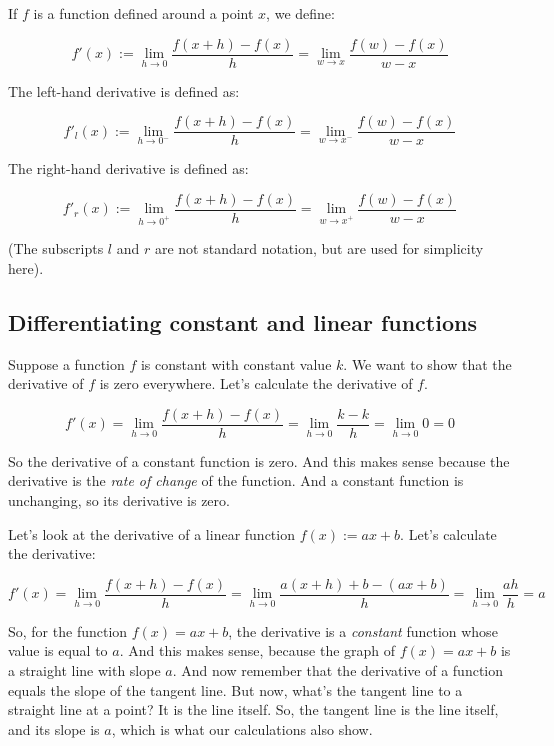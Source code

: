 \documentclass[10pt]{amsart}
\begin{document}
If $f$ is a function defined around a point $x$, we define:

\begin{equation*}
  f'(x) := \lim_{h \to 0} \frac{f(x + h) - f(x)}{h} = \lim_{w \to x} \frac{f(w) - f(x)}{w - x}
\end{equation*}

The left-hand derivative is defined as:

\begin{equation*}
  f'_l(x) := \lim_{h \to 0^-} \frac{f(x + h) - f(x)}{h} = \lim_{w \to x^-} \frac{f(w) - f(x)}{w - x}
\end{equation*}

The right-hand derivative is defined as:

\begin{equation*}
  f'_r(x) := \lim_{h \to 0^+} \frac{f(x + h) - f(x)}{h} = \lim_{w \to x^+} \frac{f(w) - f(x)}{w - x}
\end{equation*}

(The subscripts $l$ and $r$ are not standard notation, but are used
for simplicity here).

\subsection{Differentiating constant and linear functions}

Suppose a function $f$ is constant with constant value $k$. We want to
show that the derivative of $f$ is zero everywhere. Let's calculate
the derivative of $f$.

\begin{equation*}
  f'(x) = \lim_{h \to 0} \frac{f(x + h) - f(x)}{h} = \lim_{h \to 0} \frac{k - k}{h} = \lim_{h \to 0} 0 = 0
\end{equation*}

So the derivative of a constant function is zero. And this makes sense
because the derivative is the {\em rate of change} of the
function. And a constant function is unchanging, so its derivative is zero.

Let's look at the derivative of a linear function $f(x) := ax + b$. Let's calculate the derivative:

\begin{equation*}
  f'(x) = \lim_{h \to 0} \frac{f(x + h) - f(x)}{h} = \lim_{h \to 0} \frac{a(x + h) + b - (ax + b)}{h} = \lim_{h \to 0} \frac{ah}{h} = a
\end{equation*}

So, for the function $f(x) = ax + b$, the derivative is a {\em
constant} function whose value is equal to $a$. And this makes sense,
because the graph of $f(x) = ax + b$ is a straight line with slope
$a$. And now remember that the derivative of a function equals the
slope of the tangent line. But now, what's the tangent line to a
straight line at a point? It is the line itself. So, the tangent line
is the line itself, and its slope is $a$, which is what our
calculations also show.
\end{document}
